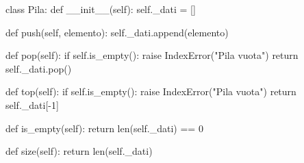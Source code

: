 \begin{unipdcode}[language=Python]
class Pila:
    def __init__(self):
        self._dati = []

    def push(self, elemento):
        self._dati.append(elemento)

    def pop(self):
        if self.is_empty():
            raise IndexError("Pila vuota")
        return self._dati.pop()

    def top(self):
        if self.is_empty():
            raise IndexError("Pila vuota")
        return self._dati[-1]

    def is_empty(self):
        return len(self._dati) == 0

    def size(self):
        return len(self._dati)
\end{unipdcode}
